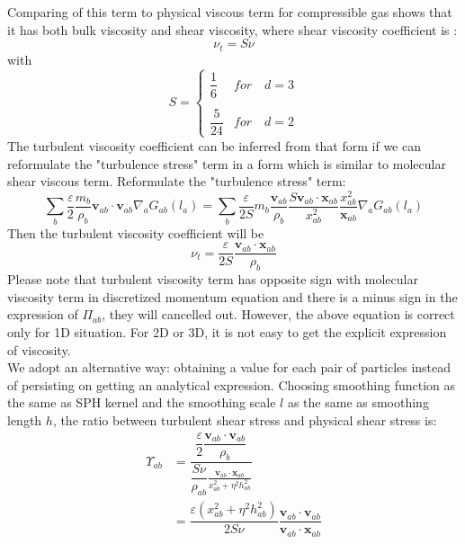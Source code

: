 \documentclass[journal abbreviation, manuscript]{copernicus}
\begin{document}
Comparing of this term to physical viscous term for compressible gas shows that it has both bulk viscosity and shear viscosity, where shear viscosity coefficient is \citep{monaghan2005smoothed}:
\begin{equation}
\nu_t = S \nu
\end{equation}
with
\begin{equation}
S= 
\begin{cases} 
      \dfrac{1}{6} & for  \quad d=3 \\
      \\
     \dfrac{5}{24}  & for  \quad d=2 
\end{cases}
\end{equation}
The turbulent viscosity coefficient can be inferred from that form if we can reformulate the "turbulence stress" term in a form which is similar to molecular shear viscous term.
Reformulate the "turbulence stress" term:
\begin{equation}
 \sum_b \dfrac{\varepsilon}{2} \dfrac{m_b}{\rho_b} \textbf{v}_{ab} \cdot \textbf{v}_{ab} \nabla_a G_{ab}(l_a)= \sum_b \dfrac{\varepsilon}{2S} m_b \dfrac{\textbf{v}_{ab}}{\rho_b} \dfrac{S \textbf{v}_{ab} \cdot \textbf{x}_{ab}}{x_{ab}^2} \dfrac{x_{ab}^2}{\textbf{x}_{ab}} \nabla_a G_{ab}(l_a) 
\end{equation}
Then the turbulent viscosity coefficient will be
\begin{equation}
\nu_t = \dfrac{\varepsilon}{2S} \dfrac{\textbf{v}_{ab} \cdot \textbf{x}_{ab}}{\rho_b}
\end{equation}
Please note that turbulent viscosity term has opposite sign with molecular viscosity term in discretized momentum equation and there is a minus sign in the expression of $\Pi_{ab}$, they will cancelled out.
However, the above equation is correct only for 1D situation. For 2D or 3D, it is not easy to get the explicit expression of viscosity. \\
We adopt an alternative way: obtaining a value for each pair of particles instead of persisting on getting an analytical expression. Choosing smoothing function as the same as SPH kernel and the smoothing scale $l$ as the same as smoothing length $h$, the ratio between turbulent shear stress and physical shear stress is: 
\begin{equation}
\begin{split}
\Upsilon_{ab} &= \dfrac{\dfrac{\varepsilon}{2} \dfrac{\textbf{v}_{ab} \cdot \textbf{v}_{ab}}{\rho_b}}{\dfrac{S \nu}{\rho_{ab}} \frac{\textbf{v}_{ab} \cdot \textbf{x}_{ab}}{x_{ab}^2 + \eta^2 h_{ab}^2}} \\
 & = \dfrac{\varepsilon (x_{ab}^2 + \eta^2 h_{ab}^2)}{2 S \nu} \dfrac{\textbf{v}_{ab} \cdot \textbf{v}_{ab}}{\textbf{v}_{ab} \cdot \textbf{x}_{ab}}
\end{split}
\end{equation}
\end{document}
